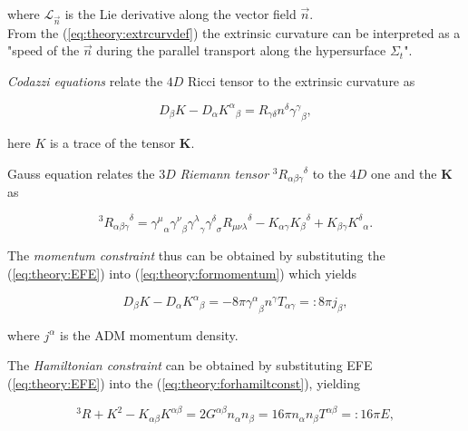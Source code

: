 {    where $\mathcal{L}_{\vec{n}}$ is the Lie derivative along the vector field $\vec{n}$. \\
    From the (\ref{eq:theory:extrcurvdef}) the extrinsic curvature can be interpreted as a "speed of the $\vec{n}$ during the parallel transport along the hypersurface $\Sigma_t$".
    
    \textit{Codazzi equations} relate the $4D$ Ricci tensor to the extrinsic curvature as
    
    \begin{equation}
        D_{\beta}K-D_{\alpha}{K^{\alpha}}_{\beta}=R_{\gamma\delta}n^{\delta}{\gamma^{\gamma}}_{\beta},
    \label{eq:theory:formomentum}
    \end{equation}
    
    here $K$ is a trace of the tensor $\boldsymbol{K}$.
    
    Gauss equation relates the $3D$ \textit{Riemann tensor} $^3{R_{\alpha\beta\gamma}}^{\delta}$ to the $4D$ one and the $\boldsymbol{K}$ as 
    
    \begin{equation}
        ^3{R_{\alpha\beta\gamma}}^{\delta} = {\gamma^{\mu}}_{\alpha}{\gamma^{\nu}}_{\beta}{\gamma^{\lambda}}_{\gamma}{\gamma^{\delta}}_{\sigma}{R_{\mu\nu\lambda}}^{\delta}-K_{\alpha\gamma}{K_{\beta}}^{\delta}+K_{\beta\gamma}{K^{\delta}}_{\alpha}.
    \label{eq:theory:forhamiltconst}
    \end{equation}
    
    The \textit{momentum constraint} thus can be obtained by substituting the (\ref{eq:theory:EFE}) into  (\ref{eq:theory:formomentum}) which yields
    
    \begin{equation}
        D_{\beta}K-D_{\alpha}{K^{\alpha}}_{\beta} = -8\pi{\gamma^{\alpha}}_{\beta} n^{\gamma}T_{\alpha\gamma}=:8\pi j_{\beta},
    \label{eq:theory:momconstraint}
    \end{equation}
    
    where $j^{\alpha}$ is the ADM momentum density.
    
    The \textit{Hamiltonian constraint} can be obtained by substituting EFE (\ref{eq:theory:EFE}) into the (\ref{eq:theory:forhamiltconst}), yielding 
    
    \begin{equation}
        ^3 R+ K^2 - K_{\alpha\beta}K^{\alpha\beta} = 2G^{\alpha\beta}n_{\alpha}n_{\beta} = 16\pi n_{\alpha}n_{\beta} T^{\alpha\beta} =: 16\pi E,
    \label{eq:theory:hamilconstraint}
    \end{equation}
    
}
